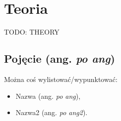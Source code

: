 \chapter{Teoria}
\label{cha:wstep}

TODO: THEORY

\section{Pojęcie (ang. \textit{po ang})}

Można coś wylistować/wypunktować:

\begin{itemize}
	\item Nazwa (ang. \textit{po ang}),
	\item Nazwa2 (ang. \textit{po ang2}).
\end{itemize}


